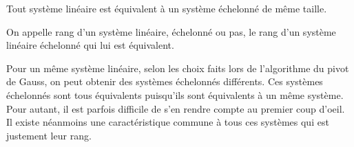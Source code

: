 \documentclass[a4paper, 11pt]{article}
\begin{document}
\vspace{0.4cm}



{\noindent  

\begin{theorem}%
 Tout syst\`eme lin\'eaire est \'equivalent \`a un syst\`eme \'echelonn\'e de m\^eme taille.
\end{theorem}
}


\vspace{0.5cm}


{\noindent  

\begin{defi}%
\noindent On appelle rang d'un syst\`eme lin\'eaire, \'echelonn\'e ou pas, le rang d'un système linéaire échelonné qui lui est équivalent. 
\end{defi}
}

\begin{rem}
Pour un m\^eme syst\`eme lin\'eaire, selon les choix faits lors de l'algorithme du pivot de Gauss, on peut obtenir des syst\`emes \'echelonn\'es diff\'erents. Ces syst\`emes \'echelonn\'es sont tous \'equivalents puisqu'ils sont \'equivalents \`a un m\^eme syst\`eme. Pour autant, il est parfois difficile de s'en rendre compte au premier coup d'oeil. Il existe n\'eanmoins une caract\'eristique commune \`a tous ces syst\`emes qui est justement leur rang. %
\end{rem}

\end{document}
